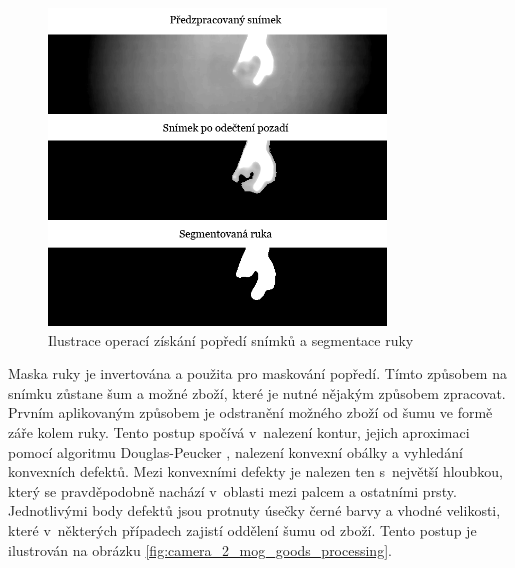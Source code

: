 \begin{figure}[h]
  \centering
  \includegraphics[width=0.8\textwidth]{images/camera_2_mog_preprocessed_substracted_hand.png}
  \caption{Ilustrace operací získání popředí snímků a segmentace ruky}
  \label{fig:camera_2_mog_preprocessed_substracted_hand}
\end{figure} 

Maska ruky je invertována a použita pro maskování popředí. Tímto způsobem na snímku zůstane šum a možné zboží, které je nutné nějakým způsobem zpracovat. Prvním aplikovaným způsobem je odstranění možného zboží od šumu ve formě záře kolem ruky. Tento postup spočívá v~nalezení kontur, jejich aproximaci pomocí algoritmu Douglas-Peucker \cite{opencvaproxpoly}, nalezení konvexní obálky a vyhledání konvexních defektů. Mezi konvexními defekty je nalezen ten s~největší hloubkou, který se pravděpodobně nachází v~oblasti mezi palcem a ostatními prsty. Jednotlivými body defektů jsou protnuty úsečky černé barvy a vhodné velikosti, které v~některých případech zajistí oddělení šumu od zboží. Tento postup je ilustrován na obrázku \ref{fig:camera_2_mog_goods_processing}.

